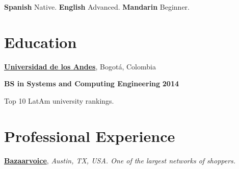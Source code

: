 
\vspace{3.5mm}
\textbf{Spanish} Native. \textbf{English} Advanced. \textbf{Mandarin} Beginner.
%

%

\section{Education}
%
% 
% 
\href{http://www.topuniversities.com/universities/universidad-de-los-andes}{\textbf{Universidad de los Andes}},
Bogot\'{a}, Colombia
\begin{outerlist}
\item[\FA \faAngleDoubleRight] \textbf{BS in Systems and Computing Engineering}
\hfill \textbf{2014}
     \begin{innerlist}
     	\item Top 10 LatAm university rankings.
     \end{innerlist}
\end{outerlist}

\section{Professional Experience}
%
\href{http://www.bazaarvoice.com/}{\textbf{Bazaarvoice}}, \textit{Austin, TX,
USA.
One of the largest networks of shoppers.}

